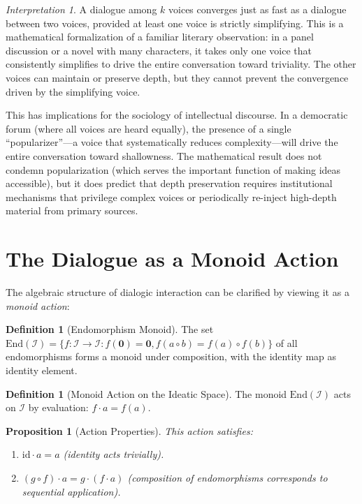 \documentclass[11pt,openany]{book}
\theoremstyle{definition}
\newtheorem{definition}[axiom]{Definition}
\theoremstyle{plain}
\newtheorem{proposition}[axiom]{Proposition}
\theoremstyle{remark}
\newtheorem{interpretation}[axiom]{Interpretation}
\newcommand{\IS}{\mathcal{I}}               %
\newcommand{\compose}{\circ}                 %
\newcommand{\void}{\mathbf{0}}              %
\begin{document}
\begin{interpretation}
A dialogue among $k$ voices converges just as fast as a dialogue between two voices, provided at least one voice is strictly simplifying. This is a mathematical formalization of a familiar literary observation: in a panel discussion or a novel with many characters, it takes only one voice that consistently simplifies to drive the entire conversation toward triviality. The other voices can maintain or preserve depth, but they cannot prevent the convergence driven by the simplifying voice.

This has implications for the sociology of intellectual discourse. In a democratic forum (where all voices are heard equally), the presence of a single ``popularizer''---a voice that systematically reduces complexity---will drive the entire conversation toward shallowness. The mathematical result does not condemn popularization (which serves the important function of making ideas accessible), but it does predict that depth preservation requires institutional mechanisms that privilege complex voices or periodically re-inject high-depth material from primary sources.
\end{interpretation}

\section{The Dialogue as a Monoid Action}

The algebraic structure of dialogic interaction can be clarified by viewing it as a \emph{monoid action}:

\begin{definition}[Endomorphism Monoid]
The set $\mathrm{End}(\IS) = \{f : \IS \to \IS : f(\void) = \void, f(a \compose b) = f(a) \compose f(b)\}$ of all endomorphisms forms a monoid under composition, with the identity map as identity element.
\end{definition}

\begin{definition}[Monoid Action on the Ideatic Space]
The monoid $\mathrm{End}(\IS)$ acts on $\IS$ by evaluation: $f \cdot a = f(a)$.
\end{definition}

\begin{proposition}[Action Properties]
This action satisfies:
\begin{enumerate}
\item $\mathrm{id} \cdot a = a$ (identity acts trivially).
\item $(g \circ f) \cdot a = g \cdot (f \cdot a)$ (composition of endomorphisms corresponds to sequential application).
\end{enumerate}
\end{proposition}
\end{document}
